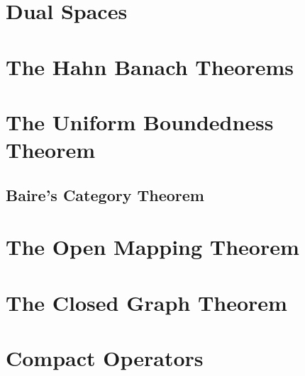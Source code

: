 \documentclass{article}
\begin{document}
\section{Dual Spaces}  

\section{The Hahn Banach Theorems}  

\section{The Uniform Boundedness Theorem}
\subsection{Baire's Category Theorem}
\section{The Open Mapping Theorem}  

\section{The Closed Graph Theorem}  

\section{Compact Operators}
\end{document}
